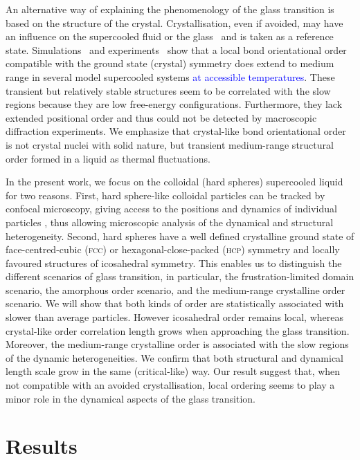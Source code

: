 An alternative way of explaining the phenomenology of the glass transition is based on the structure of the crystal. Crystallisation, even if avoided, may have an influence on the supercooled fluid or the glass~\citep{TanakaGJPCM, Cavagna2003, VanMegen2009a} and is taken as a reference state. Simulations~\cite{tanaka2010critical, Pedersen2010, Coslovich2011} and experiments~\citep{tanaka2010critical} show that a local bond orientational order compatible with the ground state (crystal) symmetry does extend to medium range in several model supercooled systems \textcolor{blue}{at accessible temperatures}. These transient but relatively stable structures seem to be correlated with the slow regions because they are low free-energy configurations. Furthermore, they lack extended positional order and thus could not be detected by macroscopic diffraction experiments. We emphasize that crystal-like bond orientational order is not crystal nuclei with solid nature, but transient medium-range structural order formed in a liquid as thermal fluctuations. 

In the present work, we focus on the colloidal (hard spheres) supercooled liquid \cite{pusey1987ogt} for two reasons. First, hard sphere-like colloidal particles can be tracked by confocal microscopy, giving access to the positions and dynamics of individual particles \cite{kegel2000swe, weeks2000}, thus allowing microscopic analysis of the dynamical and structural heterogeneity. Second, hard spheres have a well defined crystalline ground state of face-centred-cubic (\textsc{fcc}) or hexagonal-close-packed (\textsc{hcp}) symmetry and locally favoured structures of icosahedral symmetry. This enables us to distinguish the different scenarios of glass transition, in particular, the frustration-limited domain scenario, the amorphous order scenario, and the medium-range crystalline order scenario. We will show that both kinds of order are statistically associated with slower than average particles. However icosahedral order remains local, whereas crystal-like order correlation length grows when approaching the glass transition. Moreover, the medium-range crystalline order is associated with the slow regions of the dynamic heterogeneities. We confirm that both structural and dynamical length scale grow in the same (critical-like) way. Our result suggest that, when not compatible with an avoided crystallisation, local ordering seems to play a minor role in the dynamical aspects of the glass transition.


\section*{Results}

